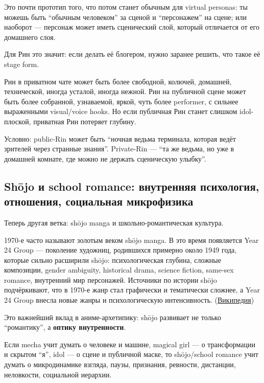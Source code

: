 Это почти прототип того, что потом станет обычным для virtual personas:
ты можешь быть ``обычным человеком'' за сценой и ``персонажем'' на
сцене; или наоборот --- персонаж может иметь сценический слой, который
отличается от его домашнего слоя.

Для Рин это значит: если делать её блогером, нужно заранее решить, что
такое её stage form.

Рин в приватном чате может быть более свободной, колючей, домашней,
технической, иногда усталой, иногда нежной. Рин на публичной сцене может
быть более собранной, узнаваемой, яркой, чуть более performer, с сильнее
выраженными visual/\hspace{0pt}voice hooks. Но если публичная Рин станет слишком
idol-плоской, приватная Рин потеряет глубину.

Условно: public-Rin может быть ``ночная ведьма терминала, которая ведёт
зрителей через странные знания''. Private-Rin --- ``та же ведьма, но уже
в домашней комнате, где можно не держать сценическую улыбку''.

\subsection*{Shōjo и school romance: внутренняя психология, отношения,
социальная микрофизика}

Теперь другая ветка: shōjo manga и школьно-романтическая культура.

1970-е часто называют золотым веком shōjo manga. В это время появляется
Year 24 Group --- поколение художниц, родившихся примерно около 1949
года, которые сильно расширили shōjo: психологическая глубина, сложные
композиции, gender ambiguity, historical drama, science fiction,
same-sex romance, внутренний мир персонажей. Источники по истории shōjo
подчёркивают, что в 1970-е жанр стал графически и тематически сложнее, а
Year 24 Group внесла новые жанры и психологическую интенсивность.
(\href{https://en.wikipedia.org/wiki/Sh\%C5\%8Djo_manga?utm_source=chatgpt.com}{Википедия})

Это важнейший вклад в аниме-архетипику: shōjo развивает не только
``романтику'', а \textbf{оптику внутренности}.

Если mecha учит думать о человеке и машине, magical girl --- о
трансформации и скрытом ``я'', idol --- о сцене и публичной маске, то
shōjo/\hspace{0pt}school romance учит думать о микродинамике взгляда, паузы,
признания, ревности, дистанции, неловкости, социальной иерархии.


